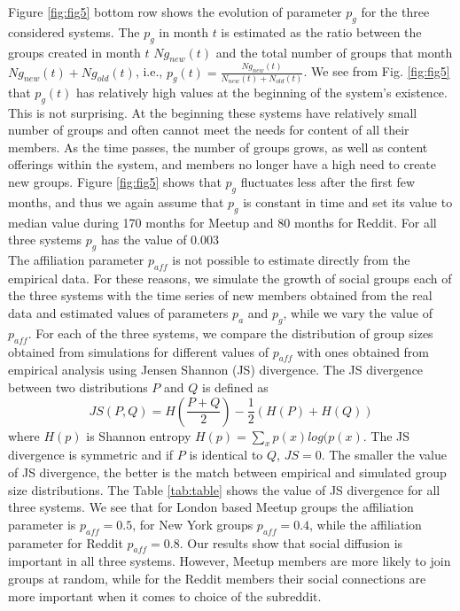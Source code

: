 Figure \ref{fig:fig5} bottom row shows the evolution of parameter $p_{g}$ for the three considered systems. The $p_{g}$ in month $t$ is estimated as the ratio between the groups created in month $t$ $Ng_{new}(t)$ and the total number of groups that month $Ng_{new}(t)+Ng_{old}(t)$, i.e., $p_{g}(t)=\frac{Ng_{new}(t)}{N_{new}(t)+N_{old}(t)}$. We see from Fig. \ref{fig:fig5} that $p_{g}(t)$ has relatively high values at the beginning of the system's existence. This is not surprising. At the beginning these systems have relatively small number of groups and often cannot meet the needs for content of all their members. As the time passes, the number of groups grows, as well as content offerings within the system, and members no longer have a high need to create new groups. Figure \ref{fig:fig5} shows that $p_{g}$ fluctuates less after the first few months, and thus we again assume that $p_{g}$ is constant in time and set its value to median value during 170 months for Meetup and 80 months for Reddit. For all three systems $p_{g}$ has the value of $0.003$\\ 
The affiliation parameter $p_{aff}$ is not possible to estimate directly from the empirical data. For these reasons, we simulate the growth of social groups each of the three systems with the time series of new members obtained from the real data and estimated values of parameters $p_a$ and $p_g$, while we vary the value of $p_{aff}$. For each of the three systems, we compare the distribution of group sizes obtained from simulations for different values of $p_{aff}$ with ones obtained from empirical analysis using Jensen Shannon (JS) divergence. The JS divergence \cite{jsdivergence} between two distributions $P$ and $Q$ is defined as 
\begin{equation}
JS(P, Q) = H\left(\frac{P+Q}{2}\right) - \frac{1}{2}\left(H(P)+H(Q)\right) \label{eq2}
\end{equation}
where $H(p)$ is Shannon entropy $H(p)=\sum_x p(x)log(p(x)$. The JS divergence is symmetric and if $P$ is identical to $Q$, $JS=0$. The smaller the value of JS divergence, the better is the match between empirical and simulated group size distributions. The Table \ref{tab:table} shows the value of JS divergence for all three systems. We see that for London based Meetup groups the affiliation parameter is $p_{aff}=0.5$, for New York groups $p_{aff}=0.4$, while the affiliation parameter for Reddit $p_{aff}=0.8$. Our results show that social diffusion is important in all three systems. However, Meetup members are more likely to join groups at random, while for the Reddit members their social connections are more important when it comes to choice of the subreddit.  


